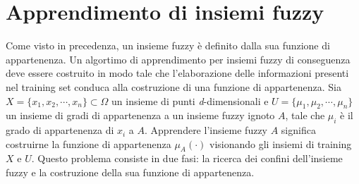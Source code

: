\documentclass [11pt,a4paper,twoside,openright] {book}
\begin{document}
\chapter{Apprendimento di insiemi fuzzy}\label{malchiodi}
Come visto in precedenza, un insieme fuzzy è definito dalla sua funzione di appartenenza. Un algortimo di apprendimento per insiemi fuzzy di conseguenza deve essere costruito in modo tale che l'elaborazione delle informazioni presenti nel training set conduca alla costruzione di una funzione di appartenenza.
Sia $X=\lbrace x_1, x_2, \cdots, x_n \rbrace \subset \Omega$ un insieme di punti \textit{d}-dimensionali e $U=\lbrace \mu_1, \mu_2, \cdots, \mu_n \rbrace$ un insieme di gradi di appartenenza a un insieme fuzzy ignoto $A$, tale che $\mu_i$ è il grado di appartenenza di $x_i$ a $A$. Apprendere l'insieme fuzzy $A$ significa costruirne la funzione di appartenenza $\mu_A(\cdot)$ visionando gli insiemi di training $X$ e $U$. Questo problema\cite{malchiodi2013learning} consiste in due fasi: la ricerca dei confini dell'insieme fuzzy e la costruzione della sua funzione di appartenenza.
\end{document}
